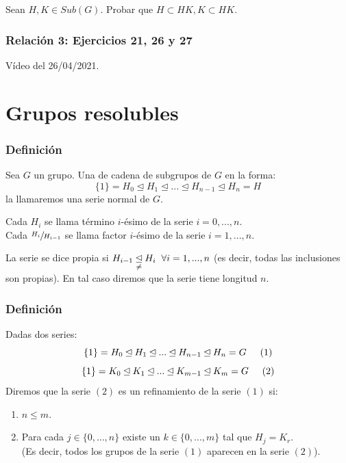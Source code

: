 \documentclass[11pt,a4paper]{article}
\begin{document}
Sean $H, K \in Sub(G)$. Probar que $H \subset HK, K \subset HK$.

\subsubsection*{Relación 3: Ejercicios 21, 26 y 27}

Vídeo del 26/04/2021.

\newpage


\section{Grupos resolubles}

\subsubsection*{Definición}

Sea $G$ un grupo. Una de cadena de subgrupos de $G$ en la forma:
$$\{1\} = H_{0} \unlhd H_{1} \unlhd ... \unlhd H_{n-1} \unlhd H_{n} = H$$
la llamaremos una serie normal de $G$.

Cada $H_{i}$ se llama término $i$-ésimo de la serie $i=0,...,n$. \\
Cada $\sfrac{H_{i}}{H_{i-1}}$ se llama factor $i$-ésimo de la serie $i = 1,...,n$.

La serie se dice propia si $H_{i-1} \underset{\neq}{\unlhd} H_{i} \hspace{0.2cm} \forall i = 1, ..., n$ (es decir, todas las inclusiones son propias). En tal caso diremos que la serie tiene longitud $n$.

\subsubsection*{Definición}

Dadas dos series:
$$\{1\} = H_{0} \unlhd H_{1} \unlhd ... \unlhd H_{n-1} \unlhd H_{n} = G \hspace{0.5cm} (1)$$
$$\{1\} = K_{0} \unlhd K_{1} \unlhd ... \unlhd K_{m-1} \unlhd K_{m} = G \hspace{0.5cm} (2)$$
Diremos que la serie $(2)$ es un refinamiento de la serie $(1)$ si:
\begin{enumerate}[label=(\roman*)]
\item $n \leq m$.
\item Para cada $j \in \{0, ..., n\}$ existe un $k \in \{0, ..., m\}$ tal que $H_{j} = K_{r}$. \\
(Es decir, todos los grupos de la serie $(1)$ aparecen en la serie $(2)$).
\end{enumerate}
\end{document}

